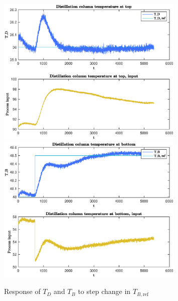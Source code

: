 \documentclass[12pt]{article}
\begin{document}
\begin{figure}
\centering
\includegraphics[width=0.8\textwidth]{../Systemanalyse/Log_Data_to_Matlab/Figurer/LV_tuning/T_D_with_T_B_step.eps}
\includegraphics[width=0.8\textwidth]{../Systemanalyse/Log_Data_to_Matlab/Figurer/LV_tuning/T_B_with_T_B_step.eps}
\caption{Response of $T_D$ and $T_B $ to step change in $T_{B, \textrm{ref}}$}
\label{fig:T_B_step}
\end{figure}
\end{document}
